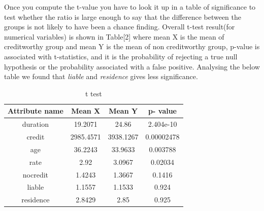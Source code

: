 \documentclass{article}\usepackage[]{graphicx}\usepackage[]{color}
\begin{document}
Once you compute the t-value you have to look it up in a table of significance to test whether the ratio is large enough to say that the difference between the groups is not likely to have been a chance finding. Overall t-test result(for numerical variables) is shown in Table[2] where mean X is the mean of creditworthy group and mean Y is the mean of non creditworthy group, p-value is associated with t-statistics, and it is the probability of rejecting a true null hypothesis or the probability associated with a false positive. Analysing the below table we found that \textit{liable} and \textit{residence} gives less significance. 
\begin{table}[t]
\caption{t test}
\centering
\begin{tabular}{c|c|c|c}
\toprule
Attribute name & Mean X & Mean Y & p- value \\
\midrule
duration & 19.2071 & 24.86 & 2.404e-10 \\
credit & 2985.4571 & 3938.1267 & 0.00002478\\ 
age & 36.2243  & 33.9633  & 0.003788\\
rate & 2.92 & 3.0967 & 0.02034 \\
nocredit & 1.4243 & 1.3667 & 0.1416\\
liable & 1.1557 & 1.1533 & 0.924\\
residence & 2.8429 & 2.85 & 0.925 \\

\bottomrule
\end{tabular}
\label{tab2}
\end{table}
\end{document}

